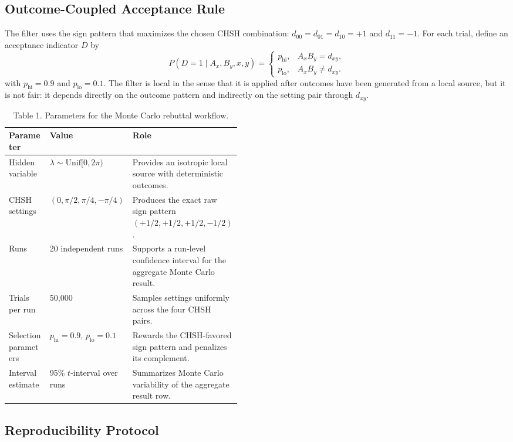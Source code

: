 \documentclass[11pt]{article}
\begin{document}
\subsection{Outcome-Coupled Acceptance Rule}

The filter uses the sign pattern that maximizes the chosen CHSH combination: $d_{00} = d_{01} = d_{10} = +1$ and $d_{11} = -1$. For each trial, define an acceptance indicator $D$ by
\[
P(D=1 \mid A_x,B_y,x,y)=\begin{cases} p_{\mathrm{hi}}, & A_x B_y = d_{xy}, \\ p_{\mathrm{lo}}, & A_x B_y \neq d_{xy}. \end{cases}
\]
with $p_{\mathrm{hi}} = 0.9$ and $p_{\mathrm{lo}} = 0.1$. The filter is local in the sense that it is applied after outcomes have been generated from a local source, but it is not fair: it depends directly on the outcome pattern and indirectly on the setting pair through $d_{xy}$.

\begin{table}[t]
\centering
\caption{Table 1. Parameters for the Monte Carlo rebuttal workflow.}
\begin{tabularx}{\linewidth}{@{}p{0.22\linewidth}p{0.24\linewidth}Y@{}}
\toprule
Parameter & Value & Role \\
\midrule
Hidden variable & $\lambda \sim \mathrm{Unif}[0, 2\pi)$ & Provides an isotropic local source with deterministic outcomes. \\
CHSH settings & $(0, \pi/2, \pi/4, -\pi/4)$ & Produces the exact raw sign pattern $(+1/2,+1/2,+1/2,-1/2)$. \\
Runs & 20 independent runs & Supports a run-level confidence interval for the aggregate Monte Carlo result. \\
Trials per run & 50,000 & Samples settings uniformly across the four CHSH pairs. \\
Selection parameters & $p_{\mathrm{hi}} = 0.9$, $p_{\mathrm{lo}} = 0.1$ & Rewards the CHSH-favored sign pattern and penalizes its complement. \\
Interval estimate & 95\% $t$-interval over runs & Summarizes Monte Carlo variability of the aggregate result row. \\
\bottomrule
\end{tabularx}
\end{table}

\subsection{Reproducibility Protocol}
\end{document}
